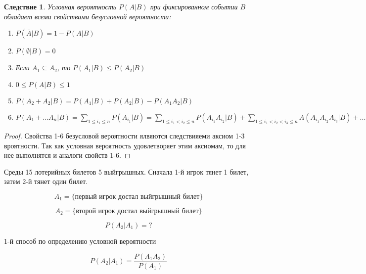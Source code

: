 \documentclass[a4paper, 14pt]{report}
\newtheorem{cont}{Следствие}[chapter]
\begin{document}
\begin{cont}
    Условная вероятность $P(A|B)$ при фиксированном событии $B$ обладает всеми свойствами безусловной вероятности:

    \begin{enumerate}
        \item $P(\overline{A}|B) = 1 - P(A|B)$
        \item $P(\emptyset|B) = 0$
        \item Если $A_1 \subseteq A_2$, то $P(A_1|B) \le P(A_2|B)$
        \item $0 \le P(A|B) \le 1$
        \item $P(A_2 + A_2|B) = P(A_1|B) + P(A_2|B) - P(A_1A_2|B)$
        \item $P(A_1+...A_n|B) = \sum_{1\le i_1 \le n} P(A_{i_1}|B) = \sum_{1 \le i_1 < i_2 \le n} P(A_{i_1}A_{i_2}|B) + \sum_{1 \le i_1 < i_2 < i_3 \le n} A(A_{i_1}A_{i_2}A_{i_3}|B) + ... + (-1)^{n-1} P(A_1A_2...A_n|B)$
    \end{enumerate}
\end{cont}

\begin{proof}
    Свойства 1-6 безусловой вероятности ялвяются следствияеми аксиом 1-3 вроятности. Так как условная вероятность удовлетворяет этим аксиомам, то для нее выполнятся и аналоги свойств 1-6.
\end{proof}

Среды 15 лотерийных билетов 5 выйгрышных. Сначала 1-й игрок тянет 1 билет, затем 2-й тянет один билет.

$$
A_1 = \{ \text{первый игрок достал выйгрышный билет} \}
$$

$$
A_2 = \{ \text{второй игрок достал выйгрышный билет} \}
$$

$$
P(A_2|A_1) = ?
$$

1-й способ по определению условной вероятности

$$
P(A_2|A_1) = \frac{P(A_1A_2)}{P(A_1)}
$$
\end{document}
